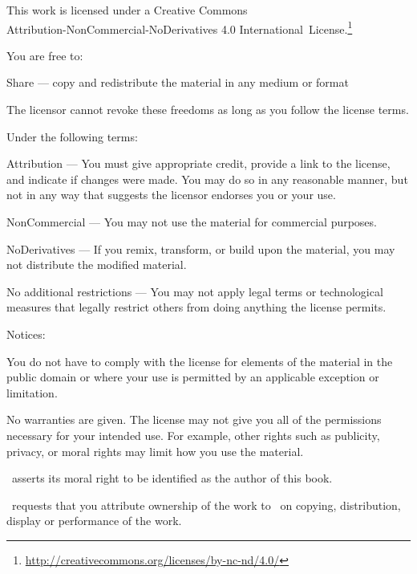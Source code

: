 \cleartorecto
\thispagestyle{plain}

{\fontsize{10}{14}\selectfont%
\setlength{\parindent}{0pt}%
\raggedright\label{copyright-details}%
\setlength{\parskip}{7pt}%

{\centering

{\LARGE\ccbyncnd}

This work is licensed under a Creative Commons\\
Attribution-NonCommercial-NoDerivatives 4.0 International~License.\footnote{%
\href{http://creativecommons.org/licenses/by-nc-nd/4.0/}{http://creativecommons.org/licenses/by-nc-nd/4.0/}}

}

You are free to:

\begin{packeditemize}
\item Share — copy and redistribute the material in any medium or format
\end{packeditemize}

The licensor cannot revoke these freedoms as long as you follow the license terms.

Under the following terms:

\begin{packeditemize}
\item Attribution — You must give appropriate credit, provide a link to the license, and indicate if changes were made. You may do so in any reasonable manner, but not in any way that suggests the licensor endorses you or your use.
\item NonCommercial — You may not use the material for commercial purposes.
\item NoDerivatives — If you remix, transform, or build upon the material, you may not distribute the modified material.
\end{packeditemize}

No additional restrictions — You may not apply legal terms or technological measures that legally restrict others from doing anything the license permits.

Notices:

You do not have to comply with the license for elements of the material in the public domain or where your use is permitted by an applicable exception or limitation.

No warranties are given. The license may not give you all of the permissions necessary for your intended use. For example, other rights such as publicity, privacy, or moral rights may limit how you use the material.


\thePublisher\ asserts its moral right to be identified as the author of this book.

\thePublisher\ requests that you attribute ownership of the work to \thePublisher\ on copying, distribution, display or performance of the work.

}